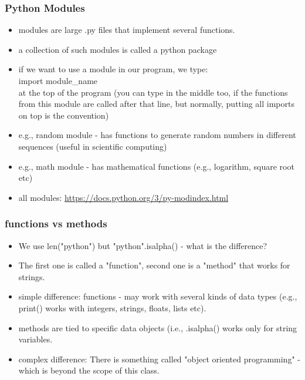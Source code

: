 \documentclass{beamer}
\begin{document}
\begin{frame}
\frametitle{Python Modules}
\begin{itemize}
\item modules are large .py files that implement several functions. 
\item a collection of such modules is called a python package
\item if we want to use a module in our program, we type:
\\ import module\_name
\\ at the top of the program (you can type in the middle too, if the functions from this module are called after that line, but normally, putting all imports on top is the convention) \\ 
\item e.g., random module - has functions to generate random numbers in different sequences (useful in scientific computing)
\item e.g., math module - has mathematical functions (e.g., logarithm, square root etc)
\item all modules: \url{https://docs.python.org/3/py-modindex.html}
\end{itemize}
\end{frame}

\begin{frame}
\frametitle{functions vs methods}
\begin{itemize}
\item We use len("python") but "python".isalpha() - what is the difference?
\item The first one is called a "function", second one is a "method" that works for strings. \pause
\item simple difference: functions - may work with several kinds of data types (e.g., print() works with integers, strings, floats, lists etc).
\item methods are tied to specific data objects (i.e., .isalpha() works only for string variables. 
\pause \item complex difference: There is something called "object oriented programming" - which is beyond the scope of this class.
\end{itemize}
\end{frame}
\end{document}
